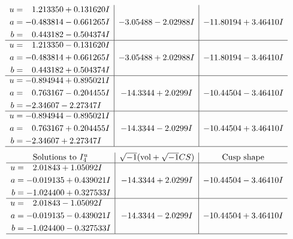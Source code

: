 \documentclass[1p]{elsarticle_modified}
\theoremstyle{definition}
\newcommand{\I}{\sqrt{-1}}
\begin{document}
$$\begin{array}{c|c|c}
\begin{aligned}
u &= \phantom{-}1.213350 + 0.131620 I \\
a &= -0.483814 - 0.661265 I \\
b &= \phantom{-}0.443182 - 0.504374 I\end{aligned}
 & -3.05488 - 2.02988 I & -11.80194 + 3.46410 I \\ \hline\begin{aligned}
u &= \phantom{-}1.213350 - 0.131620 I \\
a &= -0.483814 + 0.661265 I \\
b &= \phantom{-}0.443182 + 0.504374 I\end{aligned}
 & -3.05488 + 2.02988 I & -11.80194 - 3.46410 I \\ \hline\begin{aligned}
u &= -0.894944 + 0.895021 I \\
a &= \phantom{-}0.763167 - 0.204455 I \\
b &= -2.34607 - 2.27347 I\end{aligned}
 & -14.3344 + 2.0299 I & -10.44504 - 3.46410 I \\ \hline\begin{aligned}
u &= -0.894944 - 0.895021 I \\
a &= \phantom{-}0.763167 + 0.204455 I \\
b &= -2.34607 + 2.27347 I\end{aligned}
 & -14.3344 - 2.0299 I & -10.44504 + 3.46410 I\\
 \hline 
 \end{array}$$\newpage$$\begin{array}{c|c|c}  
\text{Solutions to }I^u_{4}& \I (\text{vol} + \sqrt{-1}CS) & \text{Cusp shape}\\
 \hline 
\begin{aligned}
u &= \phantom{-}2.01843 + 1.05092 I \\
a &= -0.019135 + 0.439021 I \\
b &= -1.024400 + 0.327533 I\end{aligned}
 & -14.3344 + 2.0299 I & -10.44504 - 3.46410 I \\ \hline\begin{aligned}
u &= \phantom{-}2.01843 - 1.05092 I \\
a &= -0.019135 - 0.439021 I \\
b &= -1.024400 - 0.327533 I\end{aligned}
 & -14.3344 - 2.0299 I & -10.44504 + 3.46410 I\\
 \hline 
 \end{array}$$\newpage
\newpage\renewcommand{\arraystretch}{1}
\end{document}
